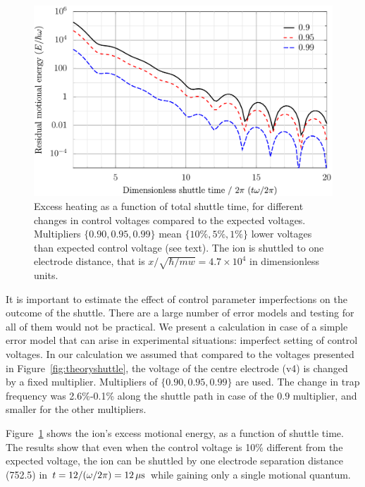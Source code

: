 \begin{figure}[h!t]
\centering
\includegraphics{chapter3/movewell/moveheat}
\caption[Heating due to imperfect shuttle voltages]{Excess heating as a function of total shuttle time, for different changes in control voltages compared to the expected voltages. Multipliers $\{0.90,0.95,0.99\}$ mean $\{10\%,5\%,1\%\}$ lower voltages than expected control voltage (see text). The ion is shuttled to one electrode distance, that is $x/\sqrt{\hbar/m w} = 4.7\times 10^4$ in dimensionless units. }
\label{fig:moveheat}
\end{figure} 


It is important to estimate the effect of control parameter imperfections on the outcome of the shuttle. There are a large number of error models and testing for all of them would not be practical. We present a calculation in case of a simple error model that can arise in experimental situations: imperfect setting of control voltages. In our calculation we assumed that compared to the voltages presented in Figure~\ref{fig:theoryshuttle}, the voltage of the centre electrode (v4) is changed by a fixed multiplier. Multipliers of $\{0.90,0.95,0.99\}$ are used. The change in trap frequency was 2.6\%-0.1\% along the shuttle path in case of the $0.9$ multiplier, and smaller for the other multipliers.

Figure~\ref{fig:moveheat} shows the ion's excess motional energy, as a function of shuttle time. The results show that even when the control voltage is 10\% different from the expected voltage, the ion can be shuttled by one electrode separation distance (752.5\um) in $t = 12 / (\omega/2\pi) = 12\,\mbox{$\mu$s}$ while gaining only a single motional quantum.


